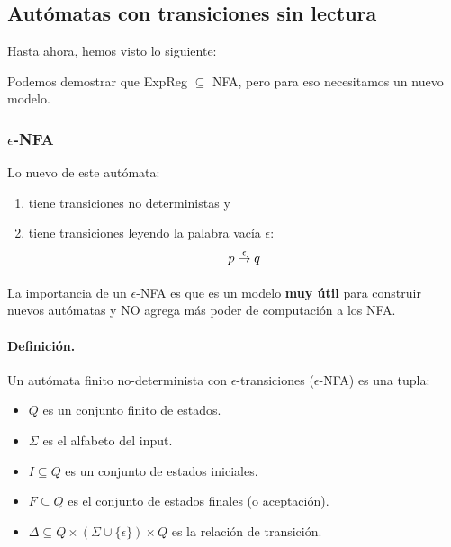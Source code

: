 \subsection{Autómatas con transiciones sin lectura}
Hasta ahora, hemos visto lo siguiente:

Podemos demostrar que ExpReg $\subseteq$ NFA, pero para eso necesitamos un nuevo modelo.

\subsubsection[e-NFA]{$\epsilon$-NFA}

Lo nuevo de este autómata:
\begin{enumerate}
    \item tiene transiciones no deterministas y
    \item tiene transiciones leyendo la palabra vacía $\epsilon$:
          $$
              p \underset{}{\overset{\epsilon}{\to}} q
          $$
\end{enumerate}

La importancia de un $\epsilon$-NFA es que es un modelo \textbf{muy útil} para construir nuevos autómatas y NO agrega más poder de computación a los NFA.

\paragraph{Definición.} Un autómata finito no-determinista con $\epsilon$-transiciones ($\epsilon$-NFA) es una tupla:

\begin{itemize}
    \item $Q$ es un conjunto finito de estados.
    \item $\Sigma$ es el alfabeto del input.
    \item $I \subseteq Q$ es un conjunto de estados iniciales.
    \item $F \subseteq Q$ es el conjunto de estados finales (o aceptación).
    \item $\Delta \subseteq Q \times (\Sigma \cup \{\epsilon\}) \times Q$ es la relación de transición.
\end{itemize}

